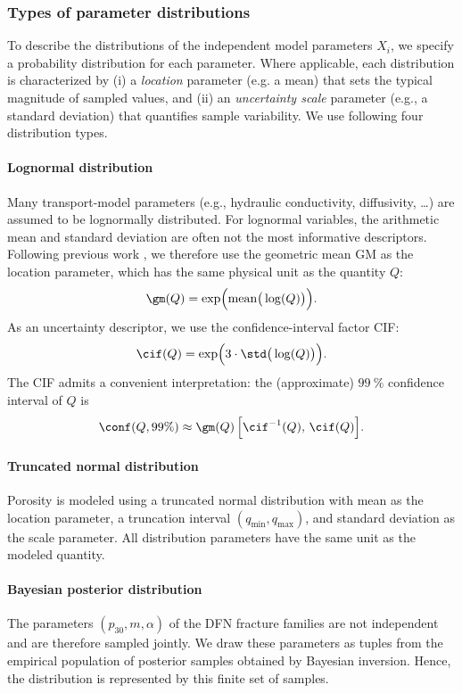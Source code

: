 \subsubsection{Types of parameter distributions}
To describe the distributions of the independent model parameters $X_i$, we specify a probability distribution for each parameter. Where applicable, each distribution is characterized by
(i) a \emph{location} parameter (e.g. a mean) that sets the typical magnitude of sampled values, and
(ii) an \emph{uncertainty scale} parameter (e.g., a standard deviation) that quantifies sample variability.
We use following four distribution types.

\paragraph{Lognormal distribution}
Many transport-model parameters (e.g., hydraulic conductivity, diffusivity, \dots) are assumed to be lognormally distributed.
For lognormal variables, the arithmetic mean and standard deviation are often not the most informative descriptors.
Following previous work \cite{tz_design}, we therefore use the geometric mean \Gls{GM} as the location parameter,
which has the same physical unit as the quantity $Q$:
\[
\gm(Q) = \exp\!\Big(\mathrm{mean}\big(\log(Q)\big)\Big).
\]
As an uncertainty descriptor, we use the confidence-interval factor \Gls{CIF}:
\[
\cif(Q) = \exp\!\Big(3 \cdot \std\big(\log(Q)\big)\Big).
\]
The \Gls{CIF} admits a convenient interpretation: the (approximate) $99~\%$ confidence interval of $Q$ is
\[
\conf(Q,99\%) \approx \gm(Q)\,\Big[\cif^{-1}(Q),\, \cif(Q)\Big].
\]

\paragraph{Truncated normal distribution}
Porosity is modeled using a truncated normal distribution with mean as the location parameter,  a truncation interval $(q_{\min}, q_{\max})$, and standard deviation as the scale parameter.
All distribution parameters have the same unit as the modeled quantity.

\paragraph{Bayesian posterior distribution}
The parameters $(p_{30}, m, \alpha)$ of the DFN fracture families are not independent and are therefore sampled jointly.
We draw these parameters as tuples from the empirical population of posterior samples obtained by Bayesian inversion.
Hence, the distribution is represented by this finite set of samples.


